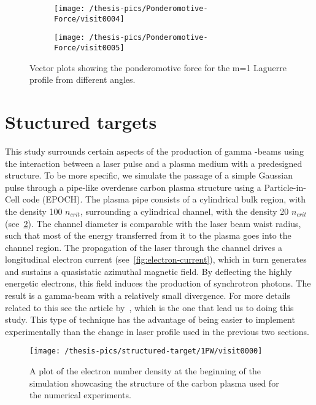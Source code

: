 \documentclass[12pt, class=report, crop=false]{standalone}
\begin{document}
\begin{figure}[!h]
  \centering
  \begin{subfigure}[t]{0.85\textwidth}
    \centering
    \texttt{[image: /thesis-pics/Ponderomotive-Force/visit0004]}
  \end{subfigure}
  \hfill
  \begin{subfigure}[t]{0.85\textwidth}
    \centering
    \texttt{[image: /thesis-pics/Ponderomotive-Force/visit0005]}
  \end{subfigure}
  \caption{Vector plots showing the ponderomotive force for the m=1 Laguerre profile from different angles.}
  \label{fig:ponderomotive-force-3}%
\end{figure}

\section{Stuctured targets}

This study surrounds certain aspects of the production of gamma
-beams using the interaction between a laser pulse and a plasma medium
with a predesigned structure. To be more specific, we simulate the
passage of a simple Gaussian pulse through a pipe-like overdense
carbon plasma structure using a Particle-in-Cell code (EPOCH). The
plasma pipe consists of a cylindrical bulk region, with the density
100 \(n_{crit}\), surrounding a cylindrical channel, with the density
20 \(n_{crit}\) (see~\cref{fig:pipe}). The channel diameter is
comparable with the laser beam waist radius, such that most of the
energy transferred from it to the plasma goes into the channel region. The
propagation of the laser through the channel drives a longitudinal
electron current (see~\cref{fig:electron-current}), which in turn
generates and sustains a quasistatic azimuthal magnetic field. By
deflecting the highly energetic electrons, this field induces the
production of synchrotron photons. The result is a gamma-beam with a
relatively small divergence. For more details related to this see the article by~\cite{wangPowerScalingCollimated2020}, which is the one that lead us to doing this study. This type of technique has the advantage of being easier to implement experimentally than the change in laser profile used in the previous two sections.

\begin{figure}[!h]
  \centering
  \texttt{[image: /thesis-pics/structured-target/1PW/visit0000]}%
  \caption{A plot of the electron number density at the beginning of
  the simulation showcasing the structure of the carbon plasma used
  for the numerical experiments.}
  \label{fig:pipe}%
\end{figure}
\end{document}
